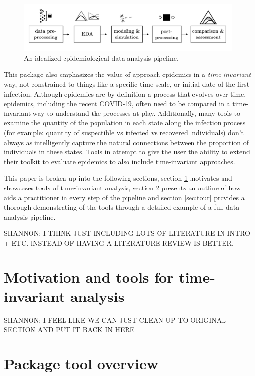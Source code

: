 \documentclass[
  shortnames]{jss}
\begin{document}
\begin{figure}[!ht]
    \centering
    \includegraphics[width = 1\textwidth]{images/pipeline1.png}
    \caption{An idealized epidemiological data analysis pipeline.}
    \label{fig:pipeline}
\end{figure}

This package also emphasizes the value of approach epidemics in a
\textit{time-invariant} way, not constrained to things like a specific
time scale, or initial date of the first infection. Although epidemics
are by definition a process that evolves over time, epidemics, including
the recent COVID-19, often need to be compared in a time-invariant way
to understand the processes at play. Additionally, many tools to examine
the quantity of the population in each state along the infection process
(for example: quantity of suspectible vs infected vs recovered
individuals) don't always as intelligently capture the natural
connections between the proportion of individuals in these states. Tools
in  attempt to give the user the ability to extend their
toolkit to evaluate epidemics to also include time-invariant approaches.

This paper is broken up into the following sections, section
\ref{sec:time-invariant} motivates and showcases tools of time-invariant
analysis, section \ref{sec:overview} presents an outline of how
 aids a practitioner in every step of the pipeline and
section \ref{sec:tour} provides a thorough demonstrating of the tools
through a detailed example of a full data analysis pipeline.

SHANNON: I THINK JUST INCLUDING LOTS OF LITERATURE IN INTRO + ETC.
INSTEAD OF HAVING A LITERATURE REVIEW IS BETTER.

\section[Time-invariant]{Motivation and tools for time-invariant
analysis}\label{sec:time-invariant}

SHANNON: I FEEL LIKE WE CAN JUST CLEAN UP TO ORIGINAL SECTION AND PUT IT
BACK IN HERE

\section[Package overview]{Package tool overview}\label{sec:overview}
\end{document}
